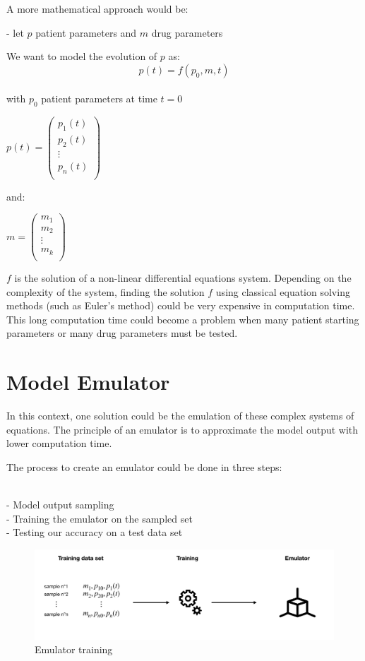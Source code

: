\documentclass{article}
\begin{document}
A more mathematical approach would be: 

- let  
$p$ patient parameters and $m$ drug parameters  

We want to model the evolution of $p$ as: 
\begin{equation}
    p(t) = f(p_0,m,t)
\end{equation}
\\
with $p_0$ patient parameters at time $t=0$    

$p(t) = \begin{pmatrix}
p_1(t)\\
p_2(t)\\
\vdots \\
p_n(t)\\
\end{pmatrix}$

and:

$m = \begin{pmatrix}
m_1\\
m_2\\
\vdots \\
m_k\\
\end{pmatrix}$

$f$  is the solution of a non-linear differential equations system. Depending on the complexity of the system, finding the solution $f $ using classical equation solving methods (such as Euler's method) could be very expensive in computation time. This long computation time could become a problem when many patient starting parameters or many drug parameters must be tested.  

\section{Model Emulator}
In this context, one solution could be the emulation of these complex systems of equations. 
The principle of an emulator is to approximate the model output with lower computation time.

The process to create an emulator could be done in three steps:

  \\
- Model output sampling  \\
- Training the emulator on the sampled set   \\
- Testing our accuracy on a test data set    \\


\begin{figure}[h!]
\centering
\includegraphics[scale=0.4]{image/emulator_creation.png}
\caption{Emulator training}
\label{fig: Emulator training}
\end{figure}
\end{document}
